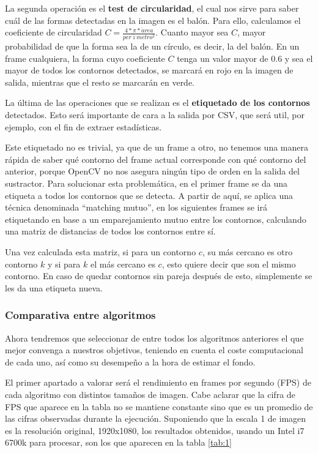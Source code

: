 La segunda operación es el \textbf{test de circularidad}, el cual nos sirve para saber cuál de las formas detectadas en la imagen es el balón. Para ello, calculamos el coeficiente de circularidad $C =  \frac{4*\pi*\acute{a}rea}{per\acute{\imath}metro^2}$. Cuanto mayor sea $C$, mayor probabilidad de que la forma sea la de un círculo, es decir, la del balón. En un frame cualquiera, la forma cuyo coeficiente $C$ tenga un valor mayor de 0.6 y sea el mayor de todos los contornos detectados, se marcará en rojo en la imagen de salida, mientras que el resto se marcarán en verde.

La última de las operaciones que se realizan es el \textbf{etiquetado de los contornos} detectados. Esto será importante de cara a la salida por CSV, que será util, por ejemplo, con el fin de extraer estadísticas.

Este etiquetado no es trivial, ya que de un frame a otro, no tenemos una manera rápida de saber qué contorno del frame actual corresponde con qué contorno del anterior, porque OpenCV no nos asegura ningún tipo de orden en la salida del sustractor. Para solucionar esta problemática, en el primer frame se da una etiqueta a todos los contornos que se detecta. A partir de aquí, se aplica una técnica denominada ``matching mutuo'', en los siguientes frames se irá etiquetando en base a un emparejamiento mutuo entre los contornos, calculando una matriz de distancias de todos los contornos entre sí. 

Una vez calculada esta matriz, si para un contorno $c$, su más cercano es otro contorno $k$ y si para $k$ el más cercano es $c$, esto quiere decir que son el mismo contorno. En caso de quedar contornos sin pareja después de esto, simplemente se les da una etiqueta nueva.

\subsubsection*{Comparativa entre algoritmos}

Ahora tendremos que seleccionar de entre todos los algoritmos anteriores el que mejor convenga a nuestros objetivos, teniendo en cuenta el coste computacional de cada uno, así como su desempeño a la hora de estimar el fondo.

El primer apartado a valorar será el rendimiento en frames por segundo (FPS) de cada algoritmo con distintos tamaños de imagen. Cabe aclarar que la cifra de FPS que aparece en la tabla no se mantiene constante sino que es un promedio de las cifras observadas durante la ejecución. Suponiendo que la escala 1 de imagen es la resolución original, 1920x1080, los resultados obtenidos, usando un Intel i7 6700k para procesar, son los que aparecen en la tabla \ref{tab:1}

